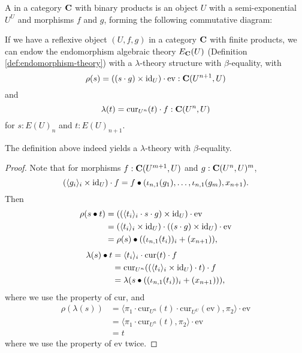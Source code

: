 \begin{definition}
  A  in a category $ \mathbf{C} $ with binary products is an object $ U $ with a semi-exponential $ U^U $ and morphisms $ f $ and $ g $, forming the following commutative diagram:
  \begin{center}
  \end{center}
\end{definition}

\begin{definition}
  If we have a reflexive object $ (U, f, g) $ in a category $ \mathbf{C} $ with finite products, we can endow the endomorphism algebraic theory $ E_{\mathbf{C}}(U) $ (Definition \ref{def:endomorphism-theory}) with a $ \lambda $-theory structure with $ \beta $-equality, with
  \[ \rho(s) = ((s \cdot g) \times \text{id}_{U}) \cdot \mathrm{ev} : \mathbf{C}(U^{n + 1}, U) \]
  and
  \[ \lambda(t) = \mathrm{cur}_{U^n}(t) \cdot f : \mathbf{C}(U^n, U) \]
  for $ s: E(U)_n $ and $ t: E(U)_{n + 1} $.
\end{definition}

\begin{lemma}
  The definition above indeed yields a $ \lambda $-theory with $ \beta $-equality.
\end{lemma}
\begin{proof}
  Note that for morphisms $ f: \mathbf{C}(U^{m + 1}, U) $ and $ g: \mathbf{C}(U^n, U)^m $,
  \[ (\langle g_i \rangle_i \times \text{id}_{U}) \cdot f = f \bullet (\iota_{n, 1}(g_1), \dots, \iota_{n, 1}(g_m), x_{n + 1}). \]
  Then
  \begin{align*}
    \rho(s \bullet t)
    &= ((\langle t_i \rangle_i \cdot s \cdot g) \times \text{id}_{U}) \cdot \mathrm{ev}\\
    &= (\langle t_i \rangle_i \times \text{id}_{U}) \cdot ((s \cdot g) \times \text{id}_{U}) \cdot \mathrm{ev}\\
    &= \rho(s) \bullet ((\iota_{n, 1}(t_i))_i + (x_{n + 1})),
  \end{align*}
  \begin{align*}
    \lambda(s) \bullet t
    &= \langle t_i \rangle_i \cdot \mathrm{cur}(t) \cdot f\\
    &= \mathrm{cur}_{U^n}((\langle t_i \rangle_i \times \text{id}_{U}) \cdot t) \cdot f\\
    &= \lambda(s \bullet ((\iota_{n, 1}(t_i))_i + (x_{n + 1}))),
  \end{align*}
  where we use the property of $ \mathrm{cur} $, and
  \begin{align*}
    \rho(\lambda(s))
    &= \langle \pi_1 \cdot \mathrm{cur}_{U^n}(t) \cdot \mathrm{cur}_{U^U}(\mathrm{ev}), \pi_2 \rangle \cdot \mathrm{ev}\\
    &= \langle \pi_1 \cdot \mathrm{cur}_{U^n}(t), \pi_2 \rangle \cdot \mathrm{ev}\\
    &= t
  \end{align*}
  where we use the property of $ \mathrm{ev} $ twice.
\end{proof}

